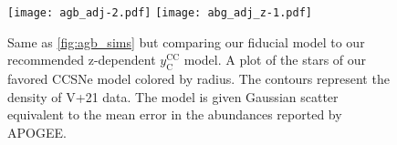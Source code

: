 \documentclass[fleqn,usenatbib]{mnras}
\begin{document}
\begin{figure}
\texttt{[image: agb\_adj-2.pdf]}
\texttt{[image: abg\_adj\_z-1.pdf]}

\caption{Same as \ref{fig:agb_sims} but comparing our fiducial model to our recommended z-dependent $y_\text{C}^\text{CC}$ model. A plot of the stars of our favored CCSNe model colored by radius. The contours represent the density of V+21 data. The model is given Gaussian scatter equivalent to the mean error in the abundances reported by APOGEE. }
\end{figure}



\bsp	%
\label{lastpage}
\end{document}
